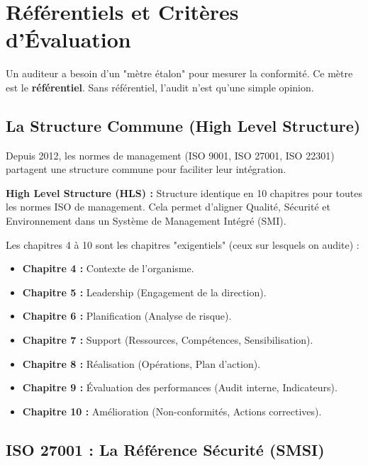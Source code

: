 \chapter{Référentiels et Critères d'Évaluation}
\label{chap:refaudit}

Un auditeur a besoin d'un "mètre étalon" pour mesurer la conformité. Ce mètre est le \textbf{référentiel}. Sans référentiel, l'audit n'est qu'une simple opinion.

\section{La Structure Commune (High Level Structure)}

Depuis 2012, les normes de management (ISO 9001, ISO 27001, ISO 22301) partagent une structure commune pour faciliter leur intégration.

\begin{boxdef}
\textbf{High Level Structure (HLS) :} Structure identique en 10 chapitres pour toutes les normes ISO de management. Cela permet d'aligner Qualité, Sécurité et Environnement dans un Système de Management Intégré (SMI).
\end{boxdef}

Les chapitres 4 à 10 sont les chapitres "exigentiels" (ceux sur lesquels on audite) :
\begin{itemize}
    \item \textbf{Chapitre 4 :} Contexte de l'organisme.
    \item \textbf{Chapitre 5 :} Leadership (Engagement de la direction).
    \item \textbf{Chapitre 6 :} Planification (Analyse de risque).
    \item \textbf{Chapitre 7 :} Support (Ressources, Compétences, Sensibilisation).
    \item \textbf{Chapitre 8 :} Réalisation (Opérations, Plan d'action).
    \item \textbf{Chapitre 9 :} Évaluation des performances (Audit interne, Indicateurs).
    \item \textbf{Chapitre 10 :} Amélioration (Non-conformités, Actions correctives).
\end{itemize}

\section{ISO 27001 : La Référence Sécurité (SMSI)}

